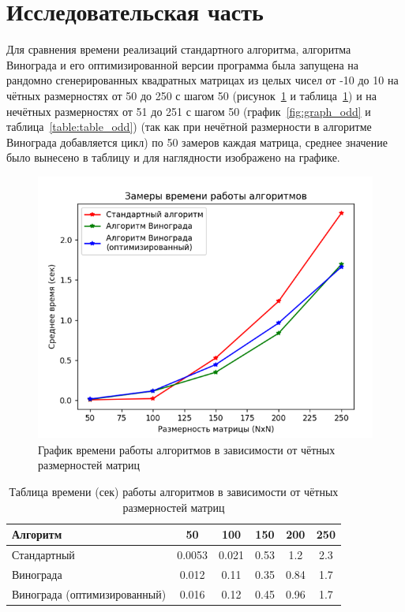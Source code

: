 \section{Исследовательская часть}

\hspace{1.25cm}
Для сравнения времени реализаций стандартного алгоритма, алгоритма Винограда и его оптимизированной версии программа была запущена на рандомно сгенерированных квадратных матрицах из целых чисел от -10 до 10 на чётных размерностях от 50 до 250 с шагом 50 (рисунок~\ref{fig:graph_even} и таблица~\ref{table:table_even}) и на нечётных размерностях от 51 до 251 с шагом 50 (график~\ref{fig:graph_odd} и таблица~\ref{table:table_odd}) (так как при нечётной размерности в алгоритме Винограда добавляется цикл) по 50 замеров каждая матрица, среднее значение было вынесено в таблицу и для наглядности изображено на графике.

\begin{figure}[H]
    \centering
    \includegraphics[width=1\textwidth]{img/graph_even.png}
    \caption{График времени работы алгоритмов в зависимости от чётных размерностей матриц}
    \label{fig:graph_even} %
\end{figure}

\begin{table}[H]
    \centering
    \begin{tabular}{|l|c|c|c|c|c|}
        \hline
        \textbf{Алгоритм} & \textbf{50} & \textbf{100} & \textbf{150} & \textbf{200} & \textbf{250}\\
        \hline
        Стандартный & 0.0053 & 0.021 & 0.53 & 1.2 & 2.3 \\
        Винограда & 0.012 & 0.11 & 0.35 & 0.84 & 1.7 \\
        Винограда (оптимизированный) & 0.016 & 0.12 & 0.45 & 0.96 & 1.7 \\
        \hline
    \end{tabular}
    \caption{Таблица времени (сек) работы алгоритмов в зависимости от чётных размерностей матриц}
    \label{table:table_even}
\end{table}

